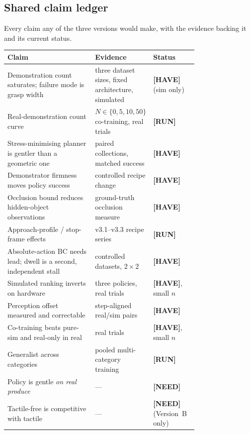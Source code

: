 \subsection{Shared claim ledger}
\label{sec:outlines:ledger}

Every claim any of the three versions would make, with the evidence backing it and its
current status.

\begin{center}\small
\begin{tabular}{p{0.46\linewidth} p{0.30\linewidth} l}
\toprule
\textbf{Claim} & \textbf{Evidence} & \textbf{Status} \\
\midrule
Demonstration count saturates; failure mode is grasp width & three dataset sizes, fixed
architecture, simulated & \textbf{[HAVE]} (sim only) \\
Real-demonstration count curve & $N\!\in\!\{0,5,10,50\}$ co-training, real trials & \textbf{[RUN]} \\
Stress-minimising planner is gentler than a geometric one & paired collections, matched
success & \textbf{[HAVE]} \\
Demonstrator firmness moves policy success & controlled recipe change & \textbf{[HAVE]} \\
Occlusion bound reduces hidden-object observations & ground-truth occlusion measure & \textbf{[HAVE]} \\
Approach-profile / stop-frame effects & v3.1--v3.3 recipe series & \textbf{[RUN]} \\
Absolute-action BC needs lead; dwell is a second, independent stall & controlled datasets,
$2\times2$ & \textbf{[HAVE]} \\
Simulated ranking inverts on hardware & three policies, real trials & \textbf{[HAVE]}, small $n$ \\
Perception offset measured and correctable & step-aligned real/sim pairs & \textbf{[HAVE]} \\
Co-training beats pure-sim and real-only in real & real trials & \textbf{[HAVE]}, small $n$ \\
Generalist across categories & pooled multi-category training & \textbf{[RUN]} \\
Policy is gentle \emph{on real produce} & --- & \textbf{[NEED]} \\
Tactile-free is competitive with tactile & --- & \textbf{[NEED]} (Version~B only) \\
\bottomrule
\end{tabular}
\end{center}

